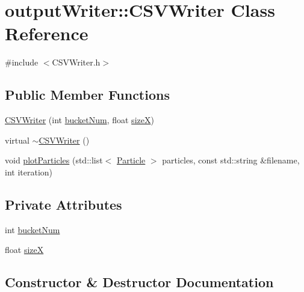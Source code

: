 \hypertarget{classoutputWriter_1_1CSVWriter}{}\section{output\+Writer\+:\+:C\+S\+V\+Writer Class Reference}
\label{classoutputWriter_1_1CSVWriter}


{\ttfamily \#include $<$C\+S\+V\+Writer.\+h$>$}

\subsection*{Public Member Functions}
\begin{DoxyCompactItemize}
\item 
\hyperlink{classoutputWriter_1_1CSVWriter_ad69d499bac14025b61130bce1fad9bc1}{C\+S\+V\+Writer} (int \hyperlink{classoutputWriter_1_1CSVWriter_aff7fb0f68a0a6823118997606ed688a2}{bucket\+Num}, float \hyperlink{classoutputWriter_1_1CSVWriter_ab72029e6c3e7fe219e71f41fe876501c}{sizeX})
\item 
virtual \hyperlink{classoutputWriter_1_1CSVWriter_acc822830c8c0672ccaec0e8eb664e423}{$\sim$\+C\+S\+V\+Writer} ()
\item 
void \hyperlink{classoutputWriter_1_1CSVWriter_a5bb4fca2ba4d90ac2466257e6d5ea359}{plot\+Particles} (std\+::list$<$ \hyperlink{classParticle}{Particle} $>$ particles, const std\+::string \&filename, int iteration)
\end{DoxyCompactItemize}
\subsection*{Private Attributes}
\begin{DoxyCompactItemize}
\item 
int \hyperlink{classoutputWriter_1_1CSVWriter_aff7fb0f68a0a6823118997606ed688a2}{bucket\+Num}
\item 
float \hyperlink{classoutputWriter_1_1CSVWriter_ab72029e6c3e7fe219e71f41fe876501c}{sizeX}
\end{DoxyCompactItemize}


\subsection{Constructor \& Destructor Documentation}
